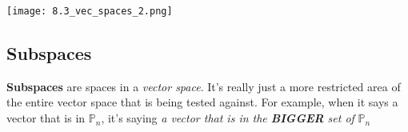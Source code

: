 \begin{center} \texttt{[image: 8.3\_vec\_spaces\_2.png]} \end{center}
\subsection{Subspaces}
\textbf{Subspaces} are spaces in a \textit{vector space}. It's really just a more restricted area of the entire vector space that is being tested against. For example, when it says a vector that is in \(\mathbb{P}_n\), it's saying \textit{ a vector that is in the \textbf{BIGGER} set of } \(\mathbb{P}_n\)